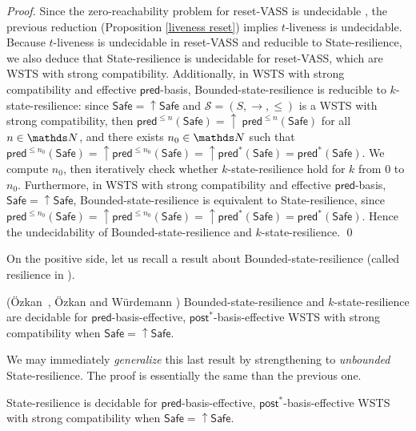 \documentclass[runningheads]{llncs}
\newcommand{\pred}{\textsf{pred}}
\newcommand{\post}{\textsf{post}}
\newcommand{\Safe}{\textsf{Safe}}
\begin{document}
\begin{proof}
Since the zero-reachability problem for reset-VASS is undecidable \cite{dufourd1998reset}, the previous reduction (Proposition \ref{liveness reset}) implies 
{\sc $t$-liveness} is undecidable.
Because
{\sc $t$-liveness} is undecidable in reset-VASS
and reducible to {\sc State-resilience}, we also deduce that {\sc State-resilience} is undecidable for reset-VASS, which are WSTS with strong compatibility.
Additionally, in WSTS with strong compatibility and effective $\pred$-basis, {\sc Bounded-state-resilience} is
reducible to {\sc $k$-state-resilience}:
since $\Safe=\mathop{\uparrow} \Safe$ and
$\mathscr{S}=(S,\rightarrow,\leq)$ is a WSTS with strong 
compatibility, then $\pred^{\leq n}(\Safe)= \mathop{\uparrow}~\pred^{\leq n}(\Safe)$ for all $n \in \N$,
and there exists $n_0 \in \N$ such that 
$\pred^{\leq n_0}(\Safe) = \mathop{\uparrow} \pred^{\leq n_0}(\Safe) = \mathop{\uparrow} \pred^*(\Safe) = \pred^*(\Safe)$.
We compute 
$n_0$, then iteratively check whether $k$-state-resilience 
hold for $k$ from $0$ to $n_0$.  
Furthermore, in WSTS with strong compatibility and effective $\pred$-basis,  $\Safe=\mathop{\uparrow} \Safe$, {\sc Bounded-state-resilience} is equivalent to {\sc State-resilience},
since 
$\pred^{\leq n_0}(\Safe) = \mathop{\uparrow} \pred^{\leq n_0}(\Safe) = {\mathop{\uparrow} \pred^*(\Safe)} = \pred^*(\Safe)$.
Hence the undecidability of {\sc Bounded-state-resilience}
and 
 {\sc $k$-state-resilience}. \qed
\end{proof}






On the positive side, let us recall a result about {\sc Bounded-state-resilience} (called resilience in \cite{DBLP:conf/gg/Ozkan22,DBLP:journals/corr/abs-2108-00889}).
%
\begin{theorem}\label{ref ozkan}
(\"Ozkan~\cite{DBLP:conf/gg/Ozkan22}, \"Ozkan and W{\"{u}}rdemann \cite{DBLP:journals/corr/abs-2108-00889})
{\sc Bounded-state-resilience} and {\sc $k$-state-resilience} are decidable for $\pred$-basis-effective, $\post^*$-basis-effective WSTS with strong compatibility
when
$\Safe=\mathop{\uparrow} \Safe$.
\end{theorem}

We may immediately  \emph{generalize} this last result by strengthening to \emph{unbounded} {\sc State-resilience}. The proof is essentially the same than the previous one.

\begin{proposition}\label{postcomputable}
{\sc State-resilience} is decidable for $\pred$-basis-effective, $\post^*$-basis-effective WSTS with strong compatibility
when
$\Safe=\mathop{\uparrow} \Safe$.
\end{proposition}
\end{document}
